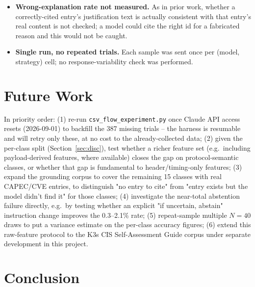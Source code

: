 \documentclass[11pt]{article}
\begin{document}
\begin{itemize}
    prior work: the Anthropic API rejects an explicit \texttt{temperature}
    parameter for \texttt{claude-sonnet-5}; GPT-4o-mini ran at true
    temperature 0. This asymmetry is a plausible, unmeasured confound on
    the model comparison.
    \item \textbf{Wrong-explanation rate not measured.} As in prior work,
    whether a correctly-cited entry's justification text is actually
    consistent with that entry's real content is not checked; a model could
    cite the right id for a fabricated reason and this would not be
    caught.
    \item \textbf{Single run, no repeated trials.} Each sample was sent
    once per (model, strategy) cell; no response-variability check was
    performed.
\end{itemize}

\section{Future Work}

In priority order: (1) re-run \texttt{csv\_flow\_experiment.py} once
Claude API access resets (2026-09-01) to backfill the 387 missing trials --
the harness is resumable and will retry only these, at no cost to the
already-collected data; (2) given the per-class split
(Section~\ref{sec:disc}), test whether a richer feature set (e.g.\
including payload-derived features, where available) closes the gap on
protocol-semantic classes, or whether that gap is fundamental to
header/timing-only features; (3) expand the grounding corpus to cover the
remaining 15 classes with real CAPEC/CVE entries, to distinguish "no
entry to cite" from "entry exists but the model didn't find it" for those
classes; (4) investigate the near-total abstention failure directly, e.g.\
by testing whether an explicit "if uncertain, abstain" instruction change
improves the 0.3--2.1\% rate; (5) repeat-sample multiple $N{=}40$ draws to
put a variance estimate on the per-class accuracy figures; (6) extend this
raw-feature protocol to the K3s CIS Self-Assessment Guide corpus under
separate development in this project.

\section{Conclusion}
\end{document}

